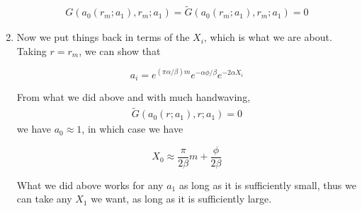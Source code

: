 \documentclass[12pt]{article}
\begin{document}
\begin{enumerate}
\begin{align*}
G(a_0(r_m; a_1), r_m; a_1) = \tilde{G}(a_0(r_m; a_1), r_m; a_1) = 0
\end{align*}

\item Now we put things back in terms of the $X_i$, which is what we are about. Taking $r = r_m$, we can show that

\[
a_i = e^{(\pi \alpha / \beta) m} e^{-\alpha \phi / \beta}e^{-2 \alpha X_i}
\]

From what we did above and with much handwaving,\begin{align*}
\tilde{G}(a_0(r; a_1), r; a_1) = 0
\end{align*} we have $a_0 \approx 1$, in which case we have

\[
X_0 \approx \frac{\pi}{2 \beta} m + \frac{\phi}{2 \beta}
\]

What we did above works for any $a_1$ as long as it is sufficiently small, thus we can take any $X_1$ we want, as long as it is sufficiently large.

\end{enumerate}
\end{document}

